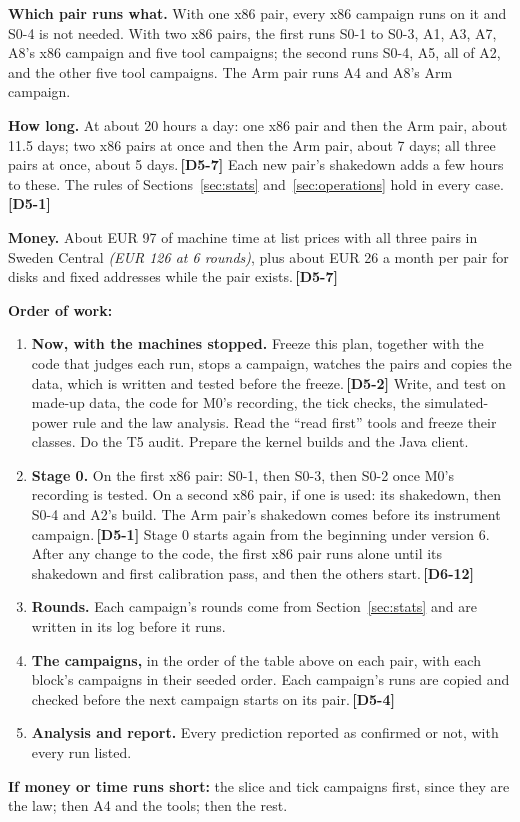 \documentclass[11pt]{article}
\newcommand{\gl}[1]{{\color{soft}\itshape\small (#1)}}
\newcommand{\chg}[1]{\,{\color{chgcol}\bfseries\footnotesize[#1]}}
\newcommand{\chgold}[1]{\,{\color{oldcol}\bfseries\footnotesize[#1]}}
\begin{document}
\textbf{Which pair runs what.} With one x86 pair, every x86 campaign runs on it and S0-4 is not needed. With two x86 pairs, the first runs S0-1 to S0-3, A1, A3, A7, A8's x86 campaign and five tool campaigns; the second runs S0-4, A5, all of A2, and the other five tool campaigns. The Arm pair runs A4 and A8's Arm campaign.

\textbf{How long.} At about 20 hours a day: one x86 pair and then the Arm pair, about 11.5 days; two x86 pairs at once and then the Arm pair, about 7 days; all three pairs at once, about 5 days.\chgold{D5-7} Each new pair's shakedown adds a few hours to these. The rules of Sections~\ref{sec:stats} and~\ref{sec:operations} hold in every case.\chgold{D5-1}

\textbf{Money.} About EUR 97 of machine time at list prices with all three pairs in Sweden Central \gl{EUR 126 at 6 rounds}, plus about EUR 26 a month per pair for disks and fixed addresses while the pair exists.\chgold{D5-7}

\textbf{Order of work:}
\begin{enumerate}
  \item \textbf{Now, with the machines stopped.} Freeze this plan, together with the code that judges each run, stops a campaign, watches the pairs and copies the data, which is written and tested before the freeze.\chgold{D5-2} Write, and test on made-up data, the code for M0's recording, the tick checks, the simulated-power rule and the law analysis. Read the ``read first'' tools and freeze their classes. Do the T5 audit. Prepare the kernel builds and the Java client.
  \item \textbf{Stage 0.} On the first x86 pair: S0-1, then S0-3, then S0-2 once M0's recording is tested. On a second x86 pair, if one is used: its shakedown, then S0-4 and A2's build. The Arm pair's shakedown comes before its instrument campaign.\chgold{D5-1} Stage 0 starts again from the beginning under version 6. After any change to the code, the first x86 pair runs alone until its shakedown and first calibration pass, and then the others start.\chg{D6-12}
  \item \textbf{Rounds.} Each campaign's rounds come from Section~\ref{sec:stats} and are written in its log before it runs.
  \item \textbf{The campaigns,} in the order of the table above on each pair, with each block's campaigns in their seeded order. Each campaign's runs are copied and checked before the next campaign starts on its pair.\chgold{D5-4}
  \item \textbf{Analysis and report.} Every prediction reported as confirmed or not, with every run listed.
\end{enumerate}
\textbf{If money or time runs short:} the slice and tick campaigns first, since they are the law; then A4 and the tools; then the rest.
\end{document}
